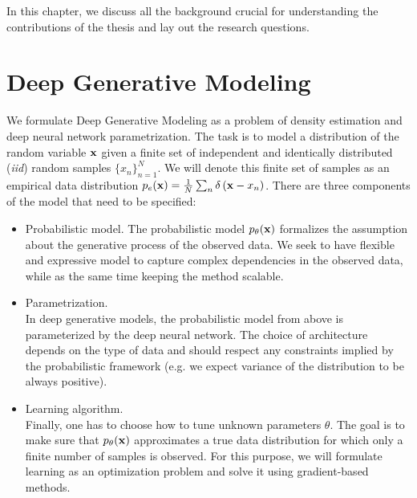 In this chapter, we discuss all the background crucial for understanding the contributions of the thesis and lay out the research questions. 


\section{Deep Generative Modeling}
We formulate Deep Generative Modeling as a problem of density estimation and deep neural network parametrization. 
The task is to model a distribution of the random variable ${\mathbf{x}}$ given a finite set of independent and identically distributed (\textit{iid}) random samples $\{x_n\}_{n=1}^N$. 
We will denote this finite set of samples as an empirical data distribution $p_e({\mathbf{x}}) = \frac1N \sum_n \delta\left({\mathbf{x}} - x_n\right)$. 
There are three components of the model that need to be specified:
\begin{itemize}
\item Probabilistic model. \newline 
{}
The probabilistic model $p_{\theta}({\mathbf{x}})$ formalizes the assumption about the generative process of the observed data. 
We seek to have flexible and expressive model to capture complex dependencies in the observed data, while as the same time keeping the method scalable.


\item Parametrization.\\
In deep generative models, the probabilistic model from above is parameterized by the deep neural network. 
The choice of architecture depends on the type of data and should respect any constraints implied by the probabilistic framework (e.g. we expect variance of the distribution to be always positive).

\item Learning algorithm. \\
Finally, one has to choose how to tune unknown parameters $\theta$. The goal is to make sure that $p_{\theta}({\mathbf{x}})$ approximates a true data distribution for which only a finite number of samples is observed. For this purpose, we will formulate learning as an optimization problem and solve it using gradient-based methods. 
\end{itemize}


